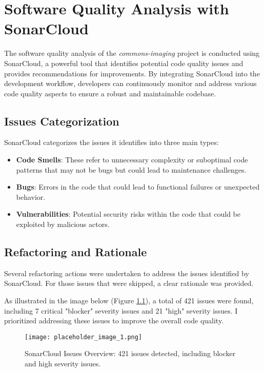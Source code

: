 \documentclass[a4paper,12pt]{report}
\begin{document}
\chapter{Software Quality Analysis with SonarCloud}
The software quality analysis of the \textit{commons-imaging} project is conducted using SonarCloud, a powerful tool that identifies potential code quality issues and provides recommendations for improvements. By integrating SonarCloud into the development workflow, developers can continuously monitor and address various code quality aspects to ensure a robust and maintainable codebase.

\section{Issues Categorization}
SonarCloud categorizes the issues it identifies into three main types:
\begin{itemize}
    \item \textbf{Code Smells}: These refer to unnecessary complexity or suboptimal code patterns that may not be bugs but could lead to maintenance challenges.
    \item \textbf{Bugs}: Errors in the code that could lead to functional failures or unexpected behavior.
    \item \textbf{Vulnerabilities}: Potential security risks within the code that could be exploited by malicious actors.
\end{itemize}

\section{Refactoring and Rationale}
Several refactoring actions were undertaken to address the issues identified by SonarCloud. For those issues that were skipped, a clear rationale was provided. 

As illustrated in the image below (Figure \ref{fig:sonar_issues}), a total of 421 issues were found, including 7 critical "blocker" severity issues and 21 "high" severity issues. I prioritized addressing these issues to improve the overall code quality.

\begin{figure}[H]
    \centering
    \texttt{[image: placeholder\_image\_1.png]} %
    \caption{SonarCloud Issues Overview: 421 issues detected, including blocker and high severity issues.}
    \label{fig:sonar_issues}
\end{figure}
\end{document}
